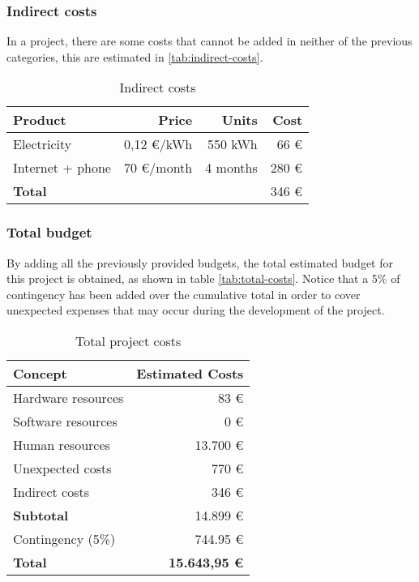\subsubsection{Indirect costs}

In a project, there are some costs that cannot be added in neither of the previous categories,
this are estimated in \autoref{tab:indirect-costs}.

\begin{table}[H]
  \centering
  \begin{tabular}{|l|r|r|r|}
    \hline
    \textbf{Product} & \textbf{Price} & \textbf{Units} & \textbf{Cost} \\ \hline\hline

    Electricity & 0,12 €/kWh & 550 kWh & 66 € \\ \hline
    Internet + phone & 70 €/month & 4 months & 280 € \\ \hline
    
    \hline\hline
    \textbf{Total} & & & 346 € \\ \hline
  \end{tabular}
  \caption{Indirect costs \label{tab:indirect-costs}}
\end{table}

\subsubsection{Total budget}

By adding all the previously provided budgets, the total estimated budget for this project
is obtained, as shown in table \autoref{tab:total-costs}. Notice that a 5\% of contingency
has been added over the cumulative total in order to cover unexpected expenses that may 
occur during the development of the project.

\begin{table}[H]
  \centering
  \begin{tabular}{|l|r|}
    \hline
    \textbf{Concept} & \textbf{Estimated Costs} \\ \hline\hline

    Hardware resources & 83 € \\ \hline
    Software resources & 0 € \\ \hline
    Human resources & 13.700 € \\ \hline
    Unexpected costs & 770 € \\ \hline
    Indirect costs & 346 € \\ \hline

    \hline\hline
    \textbf{Subtotal} & 14.899 € \\
    \hline\hline
    Contingency (5\%) & 744.95 € \\
    \hline\hline
    \textbf{Total} & \textbf{15.643,95 €} \\ \hline
  \end{tabular}

  \caption{Total project costs \label{tab:total-costs}}
\end{table}

